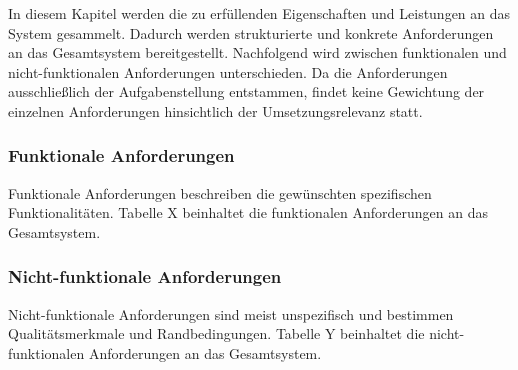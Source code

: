 In diesem Kapitel werden die zu erfüllenden Eigenschaften und Leistungen an das System gesammelt. Dadurch werden strukturierte und konkrete Anforderungen an das Gesamtsystem bereitgestellt.
Nachfolgend wird zwischen funktionalen und nicht-funktionalen Anforderungen unterschieden.
Da die Anforderungen ausschließlich der Aufgabenstellung entstammen, findet keine Gewichtung der einzelnen Anforderungen hinsichtlich der Umsetzungsrelevanz statt.

\subsubsection{Funktionale Anforderungen}\label{sec:functional_requirements}

Funktionale Anforderungen beschreiben die gewünschten spezifischen Funktionalitäten.
Tabelle X beinhaltet die funktionalen Anforderungen an das Gesamtsystem.

\subsubsection{Nicht-funktionale Anforderungen}\label{sec:non_functional_requirements}

Nicht-funktionale Anforderungen sind meist unspezifisch und bestimmen Qualitätsmerkmale und Randbedingungen.
Tabelle Y beinhaltet die nicht-funktionalen Anforderungen an das Gesamtsystem.
